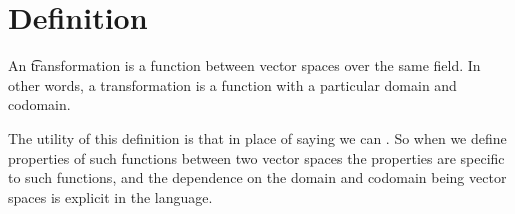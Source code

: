 
\section*{Definition}

An \t{transformation} is a function between vector spaces over the same field.
In other words, a transformation is a function with a particular domain and codomain.

The utility of this definition is that in place of saying  we can .
So when we define properties of such functions between two vector spaces the properties are specific to such functions, and the dependence on the domain and codomain being vector spaces is explicit in the language.

\blankpage